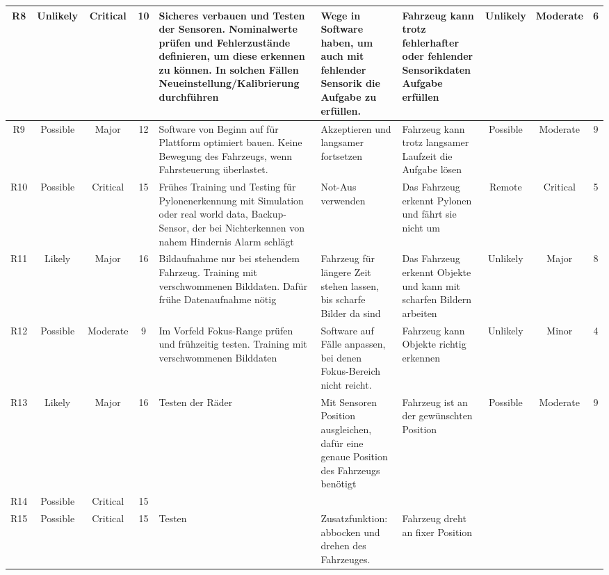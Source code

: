 \begin{landscape}
\begin{longtable}{|c|c|c|c|p{6cm}|p{4cm}|p{4cm}|c|c|c|}
R8 & Unlikely & Critical & 10 & Sicheres verbauen und Testen der Sensoren. Nominalwerte prüfen und Fehlerzustände definieren, um diese erkennen zu können. In solchen Fällen Neueinstellung/Kalibrierung durchführen & Wege in Software haben, um auch mit fehlender Sensorik die Aufgabe zu erfüllen. & Fahrzeug kann trotz fehlerhafter oder fehlender Sensorikdaten Aufgabe erfüllen & Unlikely & Moderate & 6 \\ \hline
R9 & Possible & Major & 12 & Software von Beginn auf für Plattform optimiert bauen. Keine Bewegung des Fahrzeugs, wenn Fahrsteuerung überlastet. & Akzeptieren und langsamer fortsetzen & Fahrzeug kann trotz langsamer Laufzeit die Aufgabe lösen & Possible & Moderate & 9 \\ \hline
R10 & Possible & Critical & 15 & Frühes Training und Testing für Pylonenerkennung mit Simulation oder real world data, Backup-Sensor, der bei Nichterkennen von nahem Hindernis Alarm schlägt & Not-Aus verwenden & Das Fahrzeug erkennt Pylonen und fährt sie nicht um & Remote & Critical & 5 \\ \hline
R11 & Likely & Major & 16 & Bildaufnahme nur bei stehendem Fahrzeug. Training mit verschwommenen Bilddaten. Dafür frühe Datenaufnahme nötig & Fahrzeug für längere Zeit stehen lassen, bis scharfe Bilder da sind & Das Fahrzeug erkennt Objekte und kann mit scharfen Bildern arbeiten & Unlikely & Major & 8 \\ \hline
R12 & Possible & Moderate & 9 & Im Vorfeld Fokus-Range prüfen und frühzeitig testen. Training mit verschwommenen Bilddaten & Software auf Fälle anpassen, bei denen Fokus-Bereich nicht reicht. & Fahrzeug kann Objekte richtig erkennen & Unlikely & Minor & 4 \\ \hline
R13 & Likely & Major & 16 & Testen der Räder & Mit Sensoren Position ausgleichen, dafür eine genaue Position des Fahrzeugs benötigt & Fahrzeug ist an der gewünschten Position & Possible & Moderate & 9 \\ \hline
R14 & Possible & Critical & 15 & & & & & & \\ \hline
R15 & Possible & Critical & 15 & Testen & Zusatzfunktion: abbocken und drehen des Fahrzeuges. & Fahrzeug dreht an fixer Position & & & \\ \hline
\end{longtable}

\normalsize
\end{landscape}


\addtocounter{subsection}{1}



